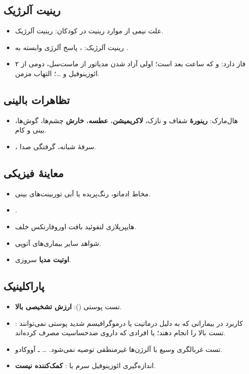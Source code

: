 \documentclass[12pt,a4paper]{article}
\begin{document}
\subsection*{رینیت آلرژیک}
\begin{itemize}
\item علت نیمی از موارد رینیت در کودکان: رینیت آلرژیک.
\item رینیت آلرژیک: ، پاسخ آلرژی وابسته به \textbf{}.
\item ۲ فاز دارد: \textbf{} و \textbf{} که  ساعت بعد است؛ اولی آزاد شدن مدیاتور از ماست‌سل، دومی از ائوزینوفیل و \ldots؛ التهاب مزمن.
\end{itemize}

\subsection*{تظاهرات بالینی}
\begin{itemize}
\item هال‌مارک: \textbf{رینورهٔ} شفاف و نازک، \textbf{لاکریمیشن}، \textbf{عطسه}، \textbf{خارش} چشم‌ها، گوش‌ها، بینی و کام.
\item {}، سرفهٔ شبانه، گرفتگی صدا.
\end{itemize}

\subsection*{معاینهٔ فیزیکی}
\begin{itemize}
\item مخاط ادماتو، رنگ‌پریده یا آبی توربینت‌های بینی.
\item \textbf{}.
\item هایپرپلازی لنفوئید بافت اوروفارنکس خلف.
\item شواهد سایر بیماری‌های آتوپی.
\item \textbf{اوتیت مدیا} سروزی.
\end{itemize}

\subsection*{پاراکلینیک}
\begin{itemize}
\item تست پوستی (): \textbf{ارزش تشخیصی بالا}.
\item {}: کاربرد در بیمارانی که به دلیل درماتیت یا درموگرافیسم شدید پوستی نمی‌توانند تست بالا را انجام دهند؛ یا افرادی که داروی ضدحساسیت مصرف کرده‌اند.
\item تست غربالگری وسیع با آلرژن‌ها غیرمنطقی توصیه نمی‌شود. \ldots{} ـ آووکادو.
\item اندازه‌گیری ائوزینوفیل سرم یا : \textbf{کمک‌کننده نیست}.
\end{itemize}
\end{document}
